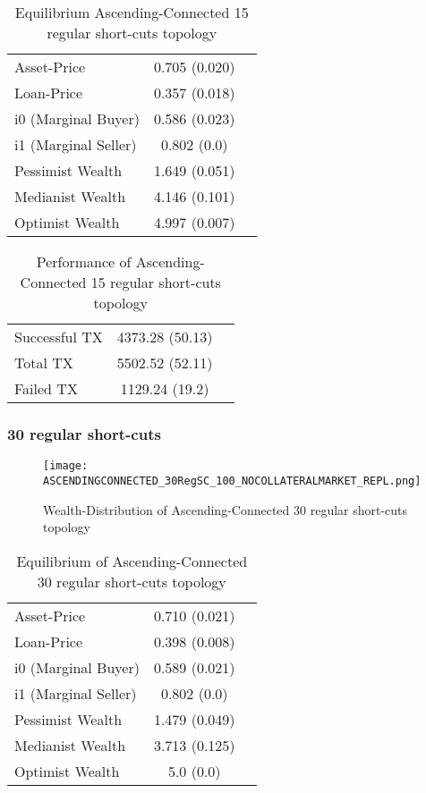 \documentclass[Bachelorarbeit.tex]{subfiles}
\begin{document}
\begin{table}[H]
	\caption{Equilibrium Ascending-Connected 15 regular short-cuts topology}
	\centering
	\begin{tabular} { l c r }
		\hline
		Asset-Price & 0.705 (0.020) \\
		Loan-Price & 0.357 (0.018) \\
		i0 (Marginal Buyer) & 0.586 (0.023) \\
		i1 (Marginal Seller) & 0.802 (0.0) \\
		Pessimist Wealth & 1.649 (0.051) \\
		Medianist Wealth & 4.146 (0.101) \\
		Optimist Wealth & 4.997 (0.007) \\
		\hline
	\end{tabular}
\end{table} 

\begin{table}[H]
	\caption{Performance of Ascending-Connected 15 regular short-cuts topology}
	\centering
	\begin{tabular} { l c r }
		\hline
		Successful TX & 4373.28 (50.13) \\
		Total TX & 5502.52 (52.11) \\
		Failed TX & 1129.24 (19.2) \\
		\hline
	\end{tabular}
\end{table}

\subsubsection{30 regular short-cuts}
\begin{figure}[H]
	\centering
  \texttt{[image: ASCENDINGCONNECTED\_30RegSC\_100\_NOCOLLATERALMARKET\_REPL.png]}
	\caption{Wealth-Distribution of Ascending-Connected 30 regular short-cuts topology}
	\label{fig1}
\end{figure}

\begin{table}[H]
	\caption{Equilibrium of Ascending-Connected 30 regular short-cuts topology}
	\centering
	\begin{tabular} { l c r }
		\hline
		Asset-Price & 0.710 (0.021) \\
		Loan-Price & 0.398 (0.008) \\
		i0 (Marginal Buyer) & 0.589 (0.021) \\
		i1 (Marginal Seller) & 0.802 (0.0) \\
		Pessimist Wealth & 1.479 (0.049) \\
		Medianist Wealth & 3.713 (0.125) \\
		Optimist Wealth & 5.0 (0.0) \\
		\hline
	\end{tabular}
\end{table} 
\end{document}
